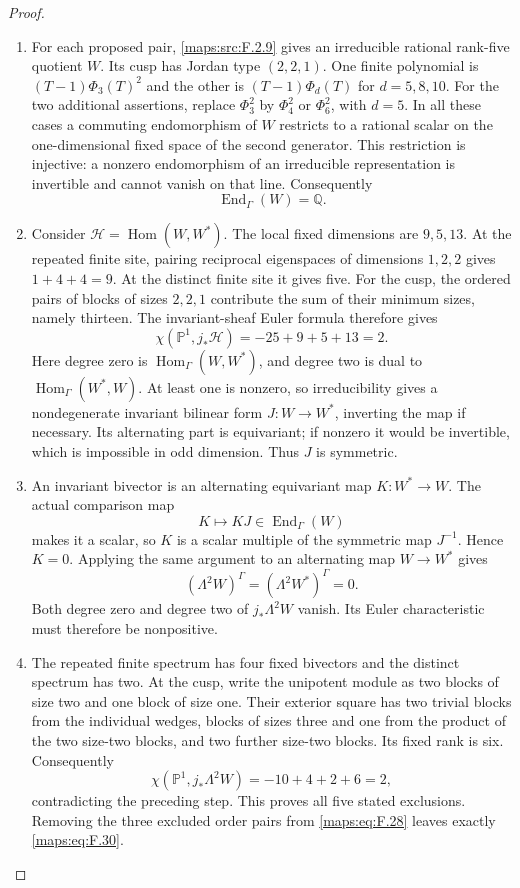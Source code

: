 \documentclass[11pt,a4paper]{article}
\theoremstyle{definition}
\begin{document}
\begin{proof}
\begin{enumerate}[label=\arabic*.]
\item For each proposed pair, \ref{maps:src:F.2.9} gives an
irreducible rational rank-five quotient $W$.  Its cusp has Jordan
type $(2,2,1)$.  One finite polynomial is
$(T-1)\Phi_3(T)^2$ and the other is $(T-1)\Phi_d(T)$ for
$d=5,8,10$.  For the two additional assertions, replace
$\Phi_3^2$ by $\Phi_4^2$ or $\Phi_6^2$, with $d=5$.
In all these cases a commuting endomorphism of $W$ restricts to a
rational scalar on the one-dimensional fixed space of the second
generator.  This restriction is injective: a nonzero endomorphism
of an irreducible representation is invertible and cannot vanish
on that line.  Consequently
\[
 \operatorname{End}_{\Gamma}(W)=\mathbb Q.
\]

\item Consider $\mathcal H=\operatorname{Hom}(W,W^*)$.
The local fixed dimensions are $9,5,13$.  At the repeated finite
site, pairing reciprocal eigenspaces of dimensions $1,2,2$ gives
$1+4+4=9$.  At the distinct finite site it gives five.
For the cusp, the ordered pairs of blocks of sizes $2,2,1$
contribute the sum of their minimum sizes, namely thirteen.
The invariant-sheaf Euler formula therefore gives
\[
 \chi(\mathbb P^1,j_*\mathcal H)=-25+9+5+13=2.
 \tag{F.31}\label{maps:eq:F.31}
\]
Here degree zero is $\operatorname{Hom}_{\Gamma}(W,W^*)$,
and degree two is dual to
$\operatorname{Hom}_{\Gamma}(W^*,W)$.  At least one is nonzero,
so irreducibility gives a nondegenerate invariant bilinear form
$J:W\longrightarrow W^*$, inverting the map if necessary.
Its alternating part is equivariant; if nonzero it would be
invertible, which is impossible in odd dimension.  Thus $J$ is
symmetric.

\item An invariant bivector is an alternating equivariant map
$K:W^*\longrightarrow W$.  The actual comparison map
\[
 K\longmapsto KJ\in\operatorname{End}_{\Gamma}(W)
\]
makes it a scalar, so $K$ is a scalar multiple of the symmetric
map $J^{-1}$.  Hence $K=0$.  Applying the same argument to an
alternating map $W\longrightarrow W^*$ gives
\[
 (\Lambda^2W)^\Gamma=(\Lambda^2W^*)^\Gamma=0.
\]
Both degree zero and degree two of $j_*\Lambda^2W$ vanish.
Its Euler characteristic must therefore be nonpositive.

\item The repeated finite spectrum has four fixed bivectors and
the distinct spectrum has two.  At the cusp, write the unipotent
module as two blocks of size two and one block of size one.
Their exterior square has two trivial blocks from the individual
wedges, blocks of sizes three and one from the product of the
two size-two blocks, and two further size-two blocks.  Its fixed
rank is six.  Consequently
\[
 \chi(\mathbb P^1,j_*\Lambda^2W)=-10+4+2+6=2,
\]
contradicting the preceding step.  This proves all five stated
exclusions.  Removing the three excluded order pairs from
\eqref{maps:eq:F.28} leaves exactly \eqref{maps:eq:F.30}.
\end{enumerate}
\end{proof}
\end{document}
